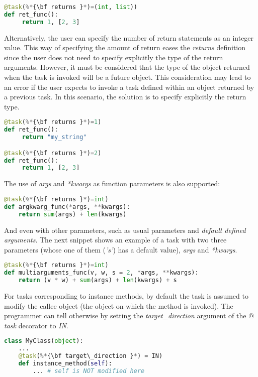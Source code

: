 \begin{lstlisting}[language=python]
@task(%*{\bf returns }*)=(int, list))
def ret_func():
     return 1, [2, 3]
\end{lstlisting}

Alternatively, the user can specify the number of return statements as an integer value. This way of
specifying the amount of return eases the {\it returns} definition since the user does not need to
specify explicitly the type of the return arguments. However, it must be considered that the type 
of the object returned when the task is invoked will be a future object.
This consideration may lead to an error if the user expects to invoke a task defined within an object
returned by a previous task. In this scenario, the solution is to specify explicitly the return type.

\begin{lstlisting}[language=python]
@task(%*{\bf returns }*)=1)
def ret_func():
     return "my_string"

@task(%*{\bf returns }*)=2)
def ret_func():
     return 1, [2, 3]
\end{lstlisting}

The use of {\it *args} and {\it **kwargs} as function parameters is also supported:

\begin{lstlisting}[language=python]
@task(%*{\bf returns }*)=int)
def argkwarg_func(*args, **kwargs):
    return sum(args) + len(kwargs)
\end{lstlisting}

And even with other parameters, such as usual parameters and {\it default defined arguments}. The next 
snippet shows an example of a task with two three parameters (whose one of them ({\it 's'}) has a default
value), {\it *args} and {\it **kwargs}.

\begin{lstlisting}[language=python]
@task(%*{\bf returns }*)=int)
def multiarguments_func(v, w, s = 2, *args, **kwargs):
    return (v * w) + sum(args) + len(kwargs) + s
\end{lstlisting}

For tasks corresponding to instance methods, by default the task is assumed to modify the callee object 
(the object on which the method is invoked). The programmer can tell otherwise by setting the 
{\it target\_direction} argument of the {\it $@$task} decorator to {\it IN}.

\begin{lstlisting}[language=python]
class MyClass(object):
    ...
    @task(%*{\bf target\_direction }*) = IN)
    def instance_method(self):
        ... # self is NOT modified here
\end{lstlisting}

